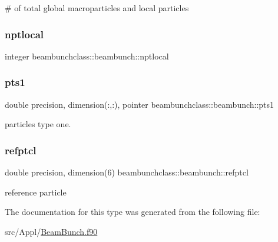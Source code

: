 \# of total global macroparticles and local particles 

\mbox{\label{structbeambunchclass_1_1beambunch_a71a8687235fdc19d862fb13092b714a3}} 
\subsubsection{\texorpdfstring{nptlocal}{nptlocal}}
{\footnotesize\ttfamily integer beambunchclass\+::beambunch\+::nptlocal}

\mbox{\label{structbeambunchclass_1_1beambunch_af0d19c1e3e537ade010af8554783c8d7}} 
\subsubsection{\texorpdfstring{pts1}{pts1}}
{\footnotesize\ttfamily double precision, dimension(\+:,\+:), pointer beambunchclass\+::beambunch\+::pts1}



particles type one. 

\mbox{\label{structbeambunchclass_1_1beambunch_a973e0e4ee1b24185bac1d727d2c074f5}} 
\subsubsection{\texorpdfstring{refptcl}{refptcl}}
{\footnotesize\ttfamily double precision, dimension(6) beambunchclass\+::beambunch\+::refptcl}



reference particle 



The documentation for this type was generated from the following file\+:\begin{DoxyCompactItemize}
\item 
src/\+Appl/\mbox{\hyperlink{_beam_bunch_8f90}{Beam\+Bunch.\+f90}}\end{DoxyCompactItemize}
